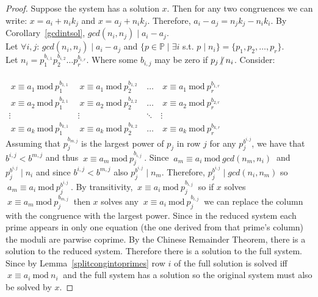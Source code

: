 \documentclass[12pt]{extarticle}
\newcommand{\divides}{\mid}
\newcommand{\ndivides}{\centernot \mid}
\newcommand{\Primes}{\mathbb{P}}
\renewcommand{\mod}[3]{\: #1 \equiv #2 \: \mathrm{mod} \: #3 \:}
\begin{document}
\begin{proof}
Suppose the system has a solution $x$. Then for any two congruences we can write: $x = a_i + n_i k_j$ and $x = a_j + n_i k_j$. Therefore, $a_i - a_j = n_jk_j - n_ik_i$. By Corollary~\ref{gcdintsol}, $gcd(n_i,n_j) \divides a_i - a_j$.\\

\noindent Let $\forall i,j$: $gcd(n_i,n_j) \divides a_i - a_j$ and $\{p \in \Primes \mid \exists i$ s.t. $p \divides n_i\} = \{p_1, p_2, \dots, p_r\}$. \\ Let $n_i = p_1^{b_{i,1}}   p_2^{b_{i,2}}   \dots   p_r^{b_{i,r}}$. Where some $b_{i,j}$ may be zero if $p_j \ndivides n_i$. Consider: \\\\
$\begin{matrix}
\mod{x}{a_1}{p_1^{b_{1,1}}} & \mod{x}{a_1}{p_2^{b_{1,2}}} & \dots & \mod{x}{a_1}{p_r^{b_{1,r}}} \\

\mod{x}{a_2}{p_1^{b_{2,1}}} & \mod{x}{a_2}{p_2^{b_{2,2}}} & \dots & \mod{x}{a_2}{p_r^{b_{2,r}}} \\

\vdots & \vdots & \ddots & \vdots \\

\mod{x}{a_k}{p_1^{b_{k,1}}} & \mod{x}{a_k}{p_2^{b_{k,2}}} & \dots & \mod{x}{a_k}{p_r^{b_{k,r}}} 
\end{matrix}$ \\

\noindent Assuming that $p_j^{b_{m,j}}$ is the largest power of $p_j$ in row $j$ for any $p_j^{b^{i,j}}$, we have that $b^{i,j} < b^{m,j}$ and thus $\mod{x}{a_m}{p_j^{b_{i,j}}}$. Since $\mod{a_m}{a_i}{gcd(n_m,n_i)}$ and $p_j^{b^{i,j}} \divides n_i$ and since $b^{i,j} < b^{m,j}$ also $p_j^{b^{i,j}} \divides n_m$. Therefore, $p_j^{b^{i,j}} \divides gcd(n_i,n_m)$ so $\mod{a_m}{a_i}{p_j^{b^{i,j}}}$. By transitivity, $\mod{x}{a_i}{p_j^{b_{i,j}}}$ so if $x$ solves $\mod{x}{a_m}{p_j^{b_{m,j}}}$ then $x$ solves any $\mod{x}{a_i}{p_j^{b_{i,j}}}$ we can replace the column with the congruence with the largest power. Since in the reduced system each prime appears in only one equation (the one derived from that prime's column) the moduli are  parwise coprime. By the Chinese Remainder Theorem, there is a solution to the reduced system. Therefore there is a solution to the full system. Since by Lemma~\ref{splitcongintoprimes} row $i$ of the full solution is solved iff $\mod{x}{a_i}{n_i}$ and the full system has a solution so the original system must also be solved by $x$.
\end{proof}
\end{document}
